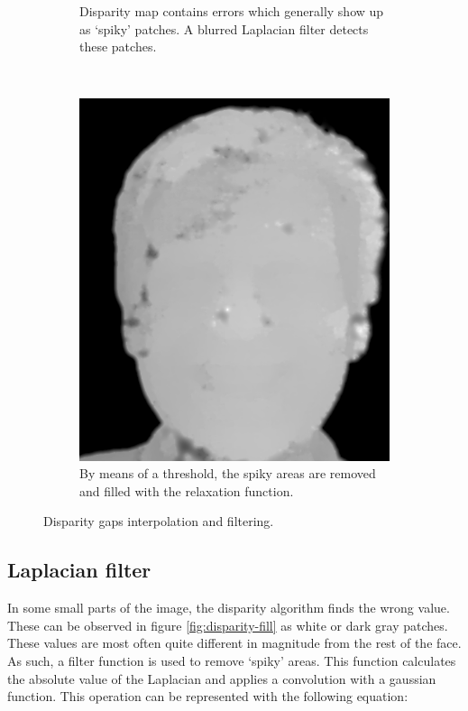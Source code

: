 \documentclass[journal]{IEEEtran}
\begin{document}
\begin{figure}[h]
\begin{subfigure}[t]{0.45\linewidth}
        \caption{Disparity map contains errors which generally show up as `spiky' patches. A blurred Laplacian filter detects these patches.}
        \label{fig:disparity-lapf}
    \end{subfigure}
    ~
    \begin{subfigure}[t]{0.45\linewidth}
        \centering
        \includegraphics[width=\linewidth]{Pics/disparity-flf.png}
        \caption{By means of a threshold, the spiky areas are removed and filled with the relaxation function.}
        \label{fig:disparity-flf}
    \end{subfigure}
    \caption{Disparity gaps interpolation and filtering.}
    \label{fig:disparity-fillgap}
\end{figure}

\subsection{Laplacian filter}
In some small parts of the image, the disparity algorithm finds the wrong value. These can be observed in figure \ref{fig:disparity-fill} as white or dark gray patches. These values are most often quite different in magnitude from the rest of the face. As such, a filter function is used to remove `spiky' areas. This function calculates the absolute value of the Laplacian and applies a convolution with a gaussian function. This operation can be represented with the following equation:
\end{document}
